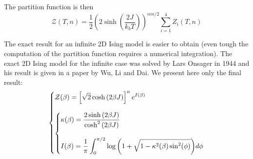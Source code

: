 \documentclass[11pt]{article}
\makeatletter
\newenvironment{system}
		{\left\lbrace\begin{array}{@{}l@{}}}
		{\end{array}\right.}
\makeatother
\begin{document}
The partition function is then
\[
\mathcal Z(T,n) = \frac{1}{2}\left(2\sinh{\left(\frac{2J}{k_bT}\right)}\right)^{nm/2}
					\sum_{i=1}^4 Z_i(T,n)
\]

The exact result for an infinite 2D Ising model is easier to obtain (even tough the computation of the partition function requires a numerical integration). The exact 2D Ising model for the infinite case was solved by Lars Onsager in 1944 and his result is given in a paper by Wu, Li and Dai\cite{bib:exact2}. We present here only the final result:
\[
\begin{system}
\displaystyle \mathcal Z(\beta) = 
			\left[\sqrt{2}\cosh{(2\beta J)}\right]^n e^{I(\beta)} 				\\
\\
\begin{system}
	\displaystyle \kappa(\beta) = 
					\frac{2\sinh{(2\beta J)}}{\cosh^2{(2\beta J)}}			\\
	\\
	\displaystyle I(\beta) = 	
					\frac{1}{\pi}\int_0^{\pi/2}
					\log{\left(1 + \sqrt{1 - \kappa^2(\beta)\sin^2(\phi)}\right)}
					d\phi
	\end{system}
\end{system}
\]



\end{document}
